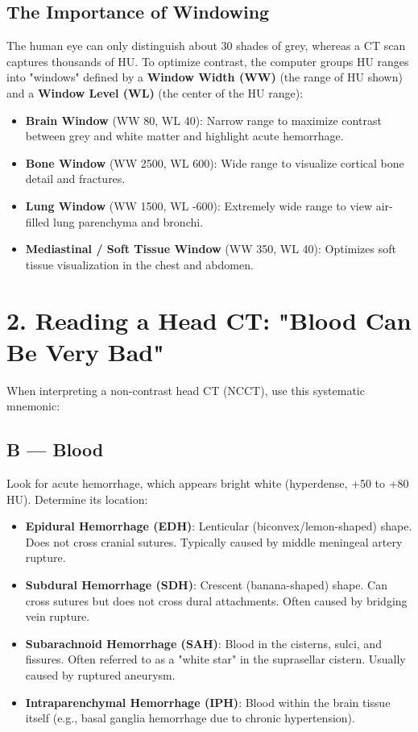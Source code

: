 \subsection*{The Importance of Windowing}
The human eye can only distinguish about 30 shades of grey, whereas a CT scan captures thousands of HU. To optimize contrast, the computer groups HU ranges into "windows" defined by a \textbf{Window Width (WW)} (the range of HU shown) and a \textbf{Window Level (WL)} (the center of the HU range):
\begin{itemize}
    \item \textbf{Brain Window} (WW 80, WL 40): Narrow range to maximize contrast between grey and white matter and highlight acute hemorrhage.
    \item \textbf{Bone Window} (WW 2500, WL 600): Wide range to visualize cortical bone detail and fractures.
    \item \textbf{Lung Window} (WW 1500, WL -600): Extremely wide range to view air-filled lung parenchyma and bronchi.
    \item \textbf{Mediastinal / Soft Tissue Window} (WW 350, WL 40): Optimizes soft tissue visualization in the chest and abdomen.
\end{itemize}


\section*{2. Reading a Head CT: "Blood Can Be Very Bad"}
When interpreting a non-contrast head CT (NCCT), use this systematic mnemonic:

\subsection*{B --- Blood}
Look for acute hemorrhage, which appears bright white (hyperdense, +50 to +80 HU). Determine its location:
\begin{itemize}
    \item \textbf{Epidural Hemorrhage (EDH)}: Lenticular (biconvex/lemon-shaped) shape. Does not cross cranial sutures. Typically caused by middle meningeal artery rupture.
    \item \textbf{Subdural Hemorrhage (SDH)}: Crescent (banana-shaped) shape. Can cross sutures but does not cross dural attachments. Often caused by bridging vein rupture.
    \item \textbf{Subarachnoid Hemorrhage (SAH)}: Blood in the cisterns, sulci, and fissures. Often referred to as a "white star" in the suprasellar cistern. Usually caused by ruptured aneurysm.
    \item \textbf{Intraparenchymal Hemorrhage (IPH)}: Blood within the brain tissue itself (e.g., basal ganglia hemorrhage due to chronic hypertension).
\end{itemize}

